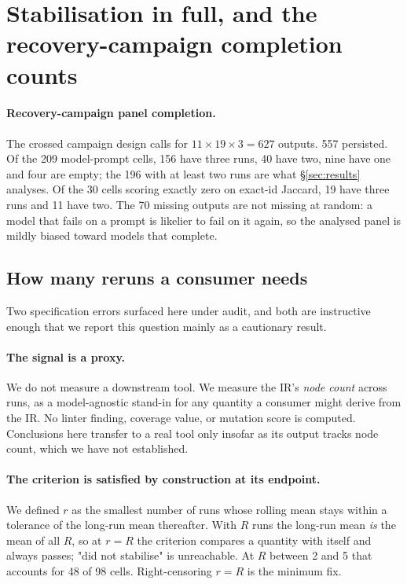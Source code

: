 \documentclass{article}
\begin{document}
\section{Stabilisation in full, and the recovery-campaign completion counts}
\label{app:rq5}

\paragraph{Recovery-campaign panel completion.}
The crossed campaign design calls for $11 \times 19 \times 3 = 627$ outputs. 557 persisted. Of the 209 model-prompt cells, 156 have three runs, 40 have two, nine have one and four are empty; the 196 with at least two runs are what \S\ref{sec:results} analyses. Of the 30 cells scoring exactly zero on exact-id Jaccard, 19 have three runs and 11 have two. The 70 missing outputs are not missing at random: a model that fails on a prompt is likelier to fail on it again, so the analysed panel is mildly biased toward models that complete.

\subsection{How many reruns a consumer needs}

Two specification errors surfaced here under audit, and both are instructive enough that we report this question mainly as a cautionary result.

\paragraph{The signal is a proxy.}
We do not measure a downstream tool. We measure the IR's \emph{node count} across runs, as a model-agnostic stand-in for any quantity a consumer might derive from the IR. No linter finding, coverage value, or mutation score is computed. Conclusions here transfer to a real tool only insofar as its output tracks node count, which we have not established.

\paragraph{The criterion is satisfied by construction at its endpoint.}
We defined $r$ as the smallest number of runs whose rolling mean stays within a tolerance of the long-run mean thereafter. With $R$ runs the long-run mean \emph{is} the mean of all $R$, so at $r=R$ the criterion compares a quantity with itself and always passes; "did not stabilise" is unreachable. At $R$ between 2 and 5 that accounts for 48 of 98 cells. Right-censoring $r=R$ is the minimum fix.
\end{document}
